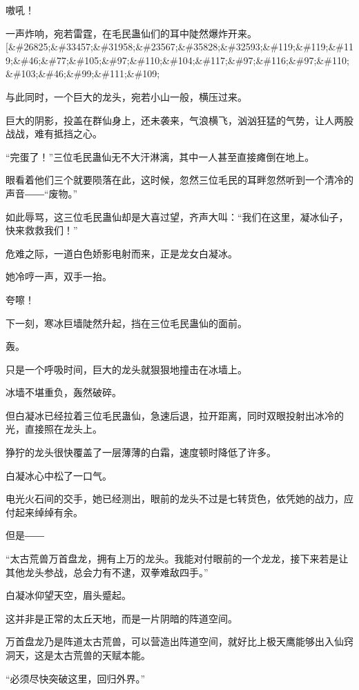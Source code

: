 
\begin{this_body}

嗷吼！

一声炸响，宛若雷霆，在毛民蛊仙们的耳中陡然爆炸开来。[\&\#26825;\&\#33457;\&\#31958;\&\#23567;\&\#35828;\&\#32593;\&\#119;\&\#119;\&\#119;\&\#46;\&\#77;\&\#105;\&\#97;\&\#110;\&\#104;\&\#117;\&\#97;\&\#116;\&\#97;\&\#110;\&\#103;\&\#46;\&\#99;\&\#111;\&\#109;

与此同时，一个巨大的龙头，宛若小山一般，横压过来。

巨大的阴影，投盖在群仙身上，还未袭来，气浪横飞，汹汹狂猛的气势，让人两股战战，难有抵挡之心。

“完蛋了！”三位毛民蛊仙无不大汗淋漓，其中一人甚至直接瘫倒在地上。

眼看着他们三个就要陨落在此，这时候，忽然三位毛民的耳畔忽然听到一个清冷的声音――“废物。”

如此辱骂，这三位毛民蛊仙却是大喜过望，齐声大叫：“我们在这里，凝冰仙子，快来救救我们！”

危难之际，一道白色娇影电射而来，正是龙女白凝冰。

她冷哼一声，双手一抬。

夸嚓！

下一刻，寒冰巨墙陡然升起，挡在三位毛民蛊仙的面前。

轰。

只是一个呼吸时间，巨大的龙头就狠狠地撞击在冰墙上。

冰墙不堪重负，轰然破碎。

但白凝冰已经拉着三位毛民蛊仙，急速后退，拉开距离，同时双眼投射出冰冷的光，直接照在龙头上。

狰狞的龙头很快覆盖了一层薄薄的白霜，速度顿时降低了许多。

白凝冰心中松了一口气。

电光火石间的交手，她已经测出，眼前的龙头不过是七转货色，依凭她的战力，应付起来绰绰有余。

但是――

“太古荒兽万首盘龙，拥有上万的龙头。我能对付眼前的一个龙龙，接下来若是让其他龙头参战，总会力有不逮，双拳难敌四手。”

白凝冰仰望天空，眉头蹙起。

这并非是正常的太丘天地，而是一片阴暗的阵道空间。

万首盘龙乃是阵道太古荒兽，可以营造出阵道空间，就好比上极天鹰能够出入仙窍洞天，这是太古荒兽的天赋本能。

“必须尽快突破这里，回归外界。”


\end{this_body}
